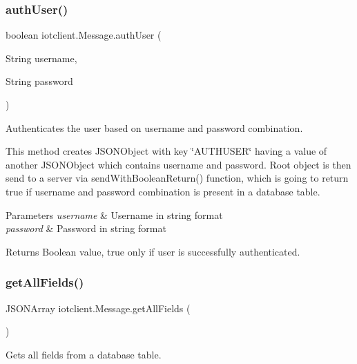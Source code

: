 \subsubsection{\texorpdfstring{auth\+User()}{authUser()}}
{\footnotesize\ttfamily boolean iotclient.\+Message.\+auth\+User (\begin{DoxyParamCaption}\item[{String}]{username,  }\item[{String}]{password }\end{DoxyParamCaption})\hspace{0.3cm}{\ttfamily [inline]}}

Authenticates the user based on username and password combination.

This method creates J\+S\+O\+N\+Object with key \char`\"{}\+A\+U\+T\+H\+U\+S\+E\+R\char`\"{} having a value of another J\+S\+O\+N\+Object which contains username and password. Root object is then send to a server via send\+With\+Boolean\+Return() function, which is going to return true if username and password combination is present in a database table.


\begin{DoxyParams}{Parameters}
{\em username} & Username in string format \\
\hline
{\em password} & Password in string format \\
\hline
\end{DoxyParams}
\begin{DoxyReturn}{Returns}
Boolean value, true only if user is successfully authenticated. 
\end{DoxyReturn}
\mbox{\label{classiotclient_1_1Message_a22814eaf8f1a8a3bb07b7823c52c83e8}} 
\subsubsection{\texorpdfstring{get\+All\+Fields()}{getAllFields()}}
{\footnotesize\ttfamily J\+S\+O\+N\+Array iotclient.\+Message.\+get\+All\+Fields (\begin{DoxyParamCaption}{ }\end{DoxyParamCaption})\hspace{0.3cm}{\ttfamily [inline]}}

Gets all fields from a database table.

